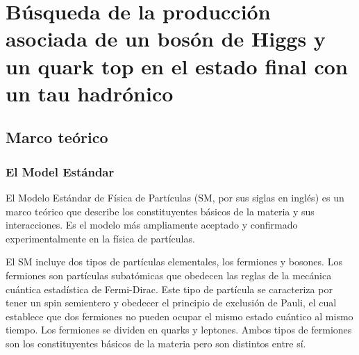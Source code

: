 
\lhead[{\bfseries \thepage}]{ \rightmark}

\label{partIII}


 \renewcommand\thesection{%
 \ifnum\value{betasect}=1%
A%
 \else
\ifnum\value{betasect}=2%
B%
\else
\ifnum\value{betasect}=3%
C%
\else
\ifnum\value{betasect}=4%
D%
\else
 \arabic{section}%
 \fi\fi\fi\fi}%

 \newenvironment{csection}{%
 \setcounter{betasect}{1}%
 }{%
 \setcounter{betasect}{0}%
 }%

 \newenvironment{bsection}{%
 \setcounter{betasect}{2}%
 }{%
 \setcounter{betasect}{0}%
 }%


\setcounter{section}{0}

\chapter*{Búsqueda de la producción asociada de un bosón de Higgs y un quark top en el estado final con un tau hadrónico}
\label{chap:resumen_cast}

\section{Marco teórico}
\subsection{El Model Estándar}
El Modelo Estándar de Física de Partículas (SM, por sus siglas en inglés) es un marco teórico que describe los
constituyentes básicos de la materia y sus interacciones. Es el modelo más ampliamente aceptado y confirmado experimentalmente en la física de partículas. 

El SM incluye dos tipos de partículas elementales, los fermiones y bosones. 
Los fermiones son partículas subatómicas que obedecen las reglas de la mecánica cuántica 
estadística de Fermi-Dirac. Este tipo de partícula se caracteriza por tener un spin semientero 
y obedecer el principio de exclusión de Pauli, el cual establece que dos fermiones no pueden 
ocupar el mismo estado cuántico al mismo tiempo. Los fermiones se dividen en quarks y leptones. 
Ambos tipos de fermiones son los constituyentes básicos de la materia pero son distintos entre sí.

